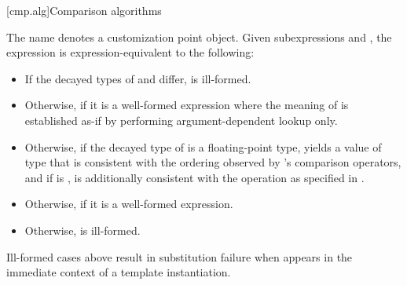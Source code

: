 [cmp.alg]{Comparison algorithms}

%
\pnum
The name  denotes
a customization point object.
Given subexpressions  and ,
the expression 
is expression-equivalent to the following:
\begin{itemize}
\item
  If the decayed types of  and  differ,
   is ill-formed.
\item
  Otherwise, 
  if it is a well-formed expression
  where the meaning of  is established as-if by performing
  argument-dependent lookup only.
\item
  Otherwise, if the decayed type  of  is
  a floating-point type,
  yields a value of type 
  that is consistent with the ordering
  observed by 's comparison operators, and
  if  is ,
  is additionally consistent with the  operation
  as specified in \IsoFloatUndated{}.
\item
  Otherwise, 
  if it is a well-formed expression.
\item
  Otherwise,  is ill-formed.
\end{itemize}

\begin{note}
Ill-formed cases above result in substitution failure
when  appears in the immediate context
of a template instantiation.
\end{note}

